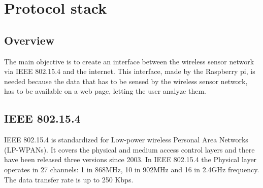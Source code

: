\section{Protocol stack}
\subsection{Overview}
The main objective is to create an interface between the wireless sensor network via IEEE 802.15.4 and the internet. This interface, made by the Raspberry pi, is needed because the data that has to be sensed by the wireless sensor network, has to be available on a web page, letting the user analyze them. \\
\subsection{IEEE 802.15.4}
IEEE 802.15.4 is standardized for Low-power wireless Personal Area Networks (LP-WPANs). It covers the physical and medium access control layers and there have been released three versions since 2003.
In IEEE 802.15.4 the Physical layer operates in 27 channels: 1 in 868MHz, 10 in 902MHz and 16 in 2.4GHz frequency. The data transfer rate is up to 250 Kbps.\cite{slide}\\
